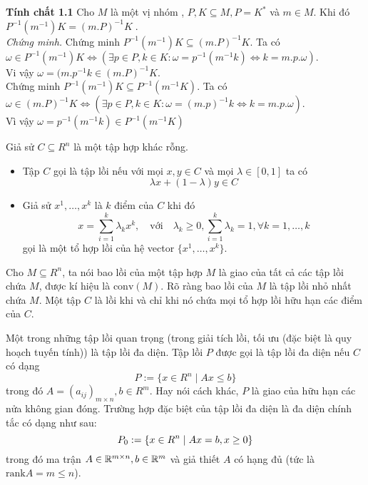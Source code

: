 \begin{flushleft}
    \textbf{Tính chất 1.1}  Cho $M$ là một vị nhóm , $P,K \subseteq M, P = K^*$ và $m \in M$. Khi đó $P^{-1}(m^{-1})K = (m.P)^{-1}K$.\\
    {\it Chứng minh.} Chứng minh $P^{-1}(m^{-1})K \subseteq (m.P)^{-1}K$. Ta có\\
    \hspace{10mm} $\omega \in P^{-1}(m^{-1})K \Leftrightarrow (\exists p \in P, k \in K : \omega = p^{-1}( m^{-1}k ) \Leftrightarrow k = m.p.\omega).$ \\
    Vi vậy $\omega = (m.p^{-1}k \in (m.P)^{-1}K.$ \\
    \hspace{10mm}Chứng minh $P^{-1}(m^{-1})K \subseteq P^{-1}( m^{-1}K )$. Ta có \\
    \hspace{20mm} $\omega \in ( m.P )^{-1}K \Leftrightarrow ( \exists p \in P , k \in K : \omega = ( m.p )^{-1}k \Leftrightarrow k = m.p.\omega ).$ \\
    Vì vậy $\omega = p^{-1}( m^{-1}k ) \in P^{-1}( m^{-1}K )$
\end{flushleft}
\begin{definition}\label{de.1.1.1} 
Giả sử $C\subseteq R^n$ là một tập hợp khác rỗng.
\begin{itemize}
\item Tập $C$ gọi là tập lồi nếu với mọi $x,y\in C$ và mọi  $\lambda\in [0,1]$ ta có
$$\lambda x+(1-\lambda)y\in C$$

\item Giả sử $x^1,\dots, x^k$ là $k$ điểm của $C$ khi đó 
\begin{equation}\label{eq.1.1.1}
x  = \sum\limits_{i=1}^k\lambda_kx^k,\quad\text{với}\quad \lambda_k\geq 0,\sum\limits_{i=1}^k\lambda_k=1,\forall k =1,\ldots,k
\end{equation}
gọi là một tổ hợp lồi của hệ vector  $\{x^1,\ldots, x^k\}$.
\end{itemize}
\end{definition}
Cho $M\subseteq R^n$, ta nói bao lồi của một tập hợp $M$ là giao của tất cả các tập lồi chứa $M$, được kí hiệu là $\text{conv}(M)$. Rõ ràng bao lồi của $M$ là tập lồi nhỏ nhất chứa $M$. Một tập $C$ là lồi khi và chỉ khi nó chứa mọi tổ hợp lồi hữu hạn các điểm của $C$.

Một trong những tập lồi quan trọng (trong giải tích lồi, tối ưu (đặc biệt là quy hoạch tuyến tính)) là tập lồi đa diện. 
Tập lồi $P$ được gọi là tập lồi đa diện nếu $C$ có dạng
\begin{equation}\label{eq.1.1.2}
P := \{x\in R^n\; |\; Ax \leq b\}
\end{equation}
trong đó $A=(a_{ij})_{m\times n}, b\in R^m$. Hay nói cách khác, $P$ là giao của hữu hạn các nửa không gian đóng.
Trường hợp đặc biệt của tập lồi đa diện là đa diện chính tắc có dạng như sau:
\begin{equation}\label{eq.1.1.3}
P_0 := \{x\in R^n\; |\; Ax = b, x\geq 0 \}
\end{equation}
trong đó ma trận $A\in{\mathbb R}^{m\times n}, b\in{\mathbb R}^m$ và giả thiết $A$ có hạng đủ (tức là $\text{rank}A = m\leq n$).

